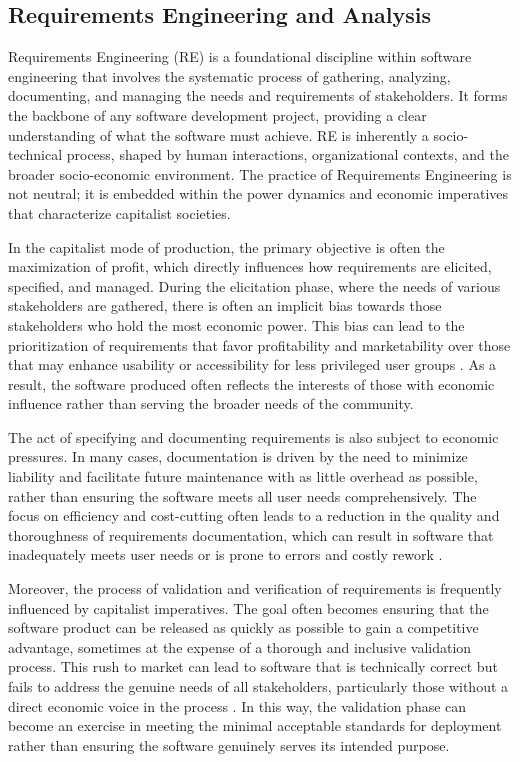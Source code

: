 \begin{refsection}
\section{Requirements Engineering and Analysis}

Requirements Engineering (RE) is a foundational discipline within software engineering that involves the systematic process of gathering, analyzing, documenting, and managing the needs and requirements of stakeholders. It forms the backbone of any software development project, providing a clear understanding of what the software must achieve. RE is inherently a socio-technical process, shaped by human interactions, organizational contexts, and the broader socio-economic environment. The practice of Requirements Engineering is not neutral; it is embedded within the power dynamics and economic imperatives that characterize capitalist societies.

In the capitalist mode of production, the primary objective is often the maximization of profit, which directly influences how requirements are elicited, specified, and managed. During the elicitation phase, where the needs of various stakeholders are gathered, there is often an implicit bias towards those stakeholders who hold the most economic power. This bias can lead to the prioritization of requirements that favor profitability and marketability over those that may enhance usability or accessibility for less privileged user groups \cite[pp.~53-72]{braverman1998labor}. As a result, the software produced often reflects the interests of those with economic influence rather than serving the broader needs of the community.

The act of specifying and documenting requirements is also subject to economic pressures. In many cases, documentation is driven by the need to minimize liability and facilitate future maintenance with as little overhead as possible, rather than ensuring the software meets all user needs comprehensively. The focus on efficiency and cost-cutting often leads to a reduction in the quality and thoroughness of requirements documentation, which can result in software that inadequately meets user needs or is prone to errors and costly rework \cite[pp.~34-58]{schiller2000digital}.

Moreover, the process of validation and verification of requirements is frequently influenced by capitalist imperatives. The goal often becomes ensuring that the software product can be released as quickly as possible to gain a competitive advantage, sometimes at the expense of a thorough and inclusive validation process. This rush to market can lead to software that is technically correct but fails to address the genuine needs of all stakeholders, particularly those without a direct economic voice in the process \cite[pp.~87-102]{marx2008capital}. In this way, the validation phase can become an exercise in meeting the minimal acceptable standards for deployment rather than ensuring the software genuinely serves its intended purpose.


\end{refsection}
